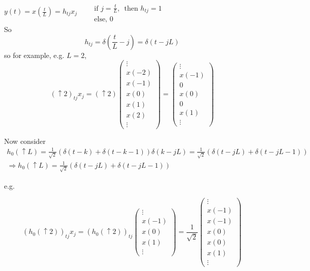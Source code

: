 \documentclass[twoside]{amsart}
\theoremstyle{plain}
\theoremstyle{definition}
\theoremstyle{remark}
\numberwithin{equation}{section}
\begin{document}
$y(t) = x\left( \frac{t}{L} \right) = h_{tj} x_j$ \quad \, $\begin{aligned} & \quad \\
  & \text{ if } j = \frac{t}{L}, \, \text{ then } h_{tj} = 1 \\
  & \text{ else, } 0 \end{aligned}$ \\
So 
\[
h_{tj} = \delta( \frac{t}{L} - j ) = \delta(t- jL)
\]
so for example, e.g. $L=2$, 
\[
(\uparrow 2)_{tj}x_j = (\uparrow 2) \left( \begin{matrix} \vdots \\ x(-2) \\ x(-1) \\ x(0) \\ x(1) \\ x(2) \\ \vdots \end{matrix} \right) = \left( \begin{matrix} \vdots \\ x(-1) \\ 0 \\ x(0) \\ 0 \\ x(1) \\ \vdots \end{matrix} \right)
\]

Now consider  \\

\[
\begin{gathered}
  h_0(\uparrow L) = \frac{1}{\sqrt{2}}(\delta(t-k) + \delta(t-k-1)) \delta(k-jL) = \frac{1}{\sqrt{2}} ( \delta(t-jL) + \delta(t-jL-1)) \\ 
  \Longrightarrow h_0(\uparrow L) = \frac{1}{\sqrt{2}} ( \delta(t-jL) + \delta(t-jL-1)) 
\end{gathered}
\]

e.g.

\[
(h_0(\uparrow 2))_{tj}x_j = (h_0(\uparrow 2))_{tj} \left( \begin{matrix} \vdots \\ x(-1) \\ x(0) \\ x(1) \\ \vdots \end{matrix} \right) = \frac{1}{\sqrt{2}} \left( \begin{matrix} \vdots \\ x(-1) \\ x(-1) \\ x(0) \\ x(0) \\ x(1) \\ \vdots \end{matrix} \right)
\]
\end{document}
